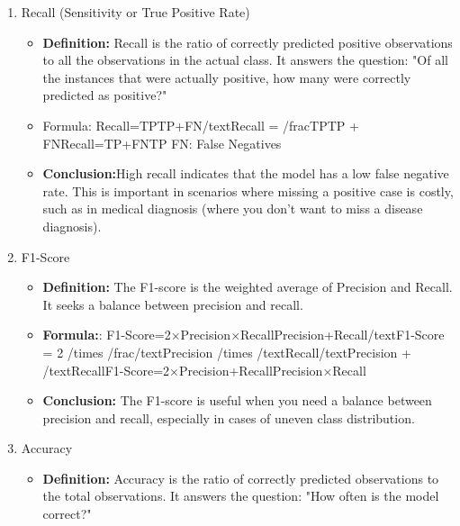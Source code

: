 \documentclass{report}
\begin{document}
{\begin{enumerate}
\begin{itemize}
        \item Formula: Precision=TPTP+FP/text{Precision} = /frac{TP}{TP + FP}Precision=TP+FPTP

        TP: True Positiveso	
        FP: False Positives

        \item \textbf{Conclusion:} High precision indicates that the model has a low false positive rate. This is crucial in cases where the cost of false positives is high, such as spam detection (where you don’t want to misclassify legitimate emails as spam).
    \end{itemize}
    \item Recall (Sensitivity or True Positive Rate)
    \begin{itemize}
        \item \textbf{Definition:} Recall is the ratio of correctly predicted positive observations to all the observations in the actual class. It answers the question: "Of all the instances that were actually positive, how many were correctly predicted as positive?"
        
        \item Formula: Recall=TPTP+FN/text{Recall} = /frac{TP}{TP + FN}Recall=TP+FNTP
        FN: False Negatives
        
        \item \textbf{Conclusion:}High recall indicates that the model has a low false negative rate. This is important in scenarios where missing a positive case is costly, such as in medical diagnosis (where you don’t want to miss a disease diagnosis).
    \end{itemize}
    \item F1-Score
    \begin{itemize}
        \item \textbf{Definition:} The F1-score is the weighted average of Precision and Recall. It seeks a balance between precision and recall.
        
        \item \textbf{Formula:}: F1-Score=2×Precision×RecallPrecision+Recall/text{F1-Score} = 2 /times /frac{/text{Precision} /times /text{Recall}}{/text{Precision} + /text{Recall}}F1-Score=2×Precision+RecallPrecision×Recall
        
        \item \textbf{Conclusion:} The F1-score is useful when you need a balance between precision and recall, especially in cases of uneven class distribution.
    \end{itemize}
    \item Accuracy
    \begin{itemize}
        \item \textbf{Definition:} Accuracy is the ratio of correctly predicted observations to the total observations. It answers the question: "How often is the model correct?"
        

\end{itemize}
\end{enumerate}}
\end{document}
